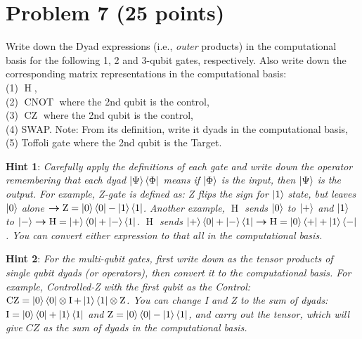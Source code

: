 \documentclass[11pt]{article}
\begin{document}
\section*{Problem 7 (25 points)}

Write down the Dyad expressions (i.e., \textit{outer} products) in the computational
basis for the following 1, 2 and 3-qubit gates, respectively. Also write down the
corresponding matrix representations in the computational basis: \\
(1) $\operatorname{H}$, \\
(2) $\operatorname{CNOT}$ where the 2nd qubit is the control, \\
(3) $\operatorname{CZ}$ where the 2nd qubit is the control, \\
(4) SWAP. Note: From its definition, write it dyads in the computational basis, \\
(5) Toffoli gate where the 2nd qubit is the Target.

\textbf{Hint 1}: \textit{Carefully apply the definitions of each gate and write down the operator remembering that each dyad $\ket{\Psi}\bra{\Phi}$ means if $\ket{\Phi}$ is the input, then $\ket{\Psi}$ is the output. For example, Z-gate is defined as: Z flips the sign for $\ket{1}$ state, but leaves $\ket{0}$ alone $\boldsymbol{\rightarrow} \operatorname{Z} = \ket{0}\bra{0} - \ket{1}\bra{1}$. Another example, $\operatorname{H}$ sends $\ket{0}$ to $\ket{+}$ and $\ket{1}$ to $\ket{-} \boldsymbol{\rightarrow} \operatorname{H} = \ket{+}\bra{0} + \ket{-}\bra{1}$. $\operatorname{H}$ sends $\ket{+}\bra{0} + \ket{-}\bra{1} \boldsymbol{\rightarrow} \operatorname{H} = \ket{0}\bra{+} + \ket{1}\bra{-}$. You can
convert either expression to that all in the computational basis.}

\textbf{Hint 2}: \textit{For the multi-qubit gates, first write down as the tensor products of single qubit dyads (or operators), then convert it to the computational basis. For example, Controlled-Z with the first qubit as the Control: $\operatorname{CZ} = \ket{0}\bra{0} \otimes \operatorname{I} + \ket{1}\bra{1} \otimes \operatorname{Z}$. You can change I and Z to the sum of dyads: $\operatorname{I} = \ket{0}\bra{0} + \ket{1}\bra{1}$ and $\operatorname{Z} = \ket{0}\bra{0} - \ket{1}\bra{1}$, and carry out the tensor, which will give $CZ$ as the sum of dyads in the computational basis.}
\end{document}
